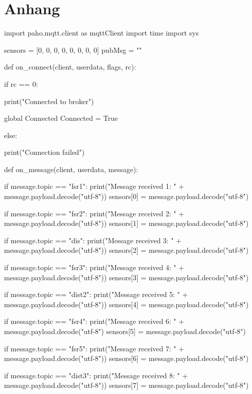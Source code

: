 \chapter{Anhang}

\begin{python}
import paho.mqtt.client as mqttClient
import time
import sys

sensors = [0, 0, 0, 0, 0, 0, 0, 0]
pubMsg = ""

def on_connect(client, userdata, flags, rc):

    if rc == 0:

        print("Connected to broker")

        global Connected                
        Connected = True                

    else:

        print("Connection failed")

def on_message(client, userdata, message):

    if message.topic == "fsr1":
        print("Message received 1: "  + 
               message.payload.decode("utf-8"))
        sensors[0] = message.payload.decode("utf-8")

    if message.topic == "fsr2":
        print("Message received 2: "  + 
               message.payload.decode("utf-8"))
        sensors[1] = message.payload.decode("utf-8")

    if message.topic == "dis":
        print("Message received 3: "  + 
               message.payload.decode("utf-8"))
        sensors[2] = message.payload.decode("utf-8")

    if message.topic == "fsr3":
        print("Message received 4: "  + 
               message.payload.decode("utf-8"))
        sensors[3] = message.payload.decode("utf-8")

    if message.topic == "dist2":
        print("Message received 5: "  + 
               message.payload.decode("utf-8"))
        sensors[4] = message.payload.decode("utf-8")

    if message.topic == "fsr4":
        print("Message received 6: "  +
               message.payload.decode("utf-8")
        sensors[5] = message.payload.decode("utf-8")

    if message.topic == "fsr5":
        print("Message received 7: "  + 
               message.payload.decode("utf-8"))
        sensors[6] = message.payload.decode("utf-8")


    if message.topic == "dist3":
        print("Message received 8: "  + 
               message.payload.decode("utf-8"))
        sensors[7] = message.payload.decode("utf-8")


\end{python}
